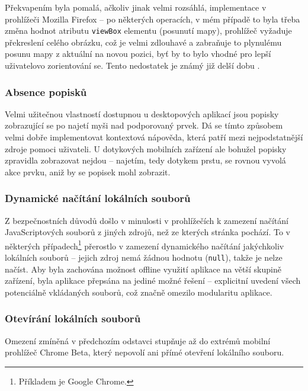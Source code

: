 Překvapením byla pomalá, ačkoliv jinak velmi rozsáhlá, implementace  v prohlížeči Mozilla Firefox -- po některých operacích, v mém případě to byla třeba změna hodnot atributu \texttt{viewBox}  elementu (posunutí mapy), prohlížeč vyžaduje překreslení celého obrázku, což je velmi zdlouhavé a zabraňuje to plynulému posunu mapy z aktuální na novou pozici, byť by to bylo vhodné pro lepší uživatelovo zorientování se. Tento nedostatek je známý již delší dobu \cite{Bugzilla}.

\subsubsection{Absence popisků}
Velmi užitečnou vlastností dostupnou u desktopových aplikací jsou popisky zobrazující se po najetí myši nad podporovaný prvek. Dá se tímto způsobem velmi dobře implementovat kontextová nápověda, která patří mezi nejpodstatnější zdroje pomoci uživateli. U dotykových mobilních zařízení ale bohužel popisky zpravidla zobrazovat nejdou -- najetím, tedy dotykem prstu, se rovnou vyvolá akce prvku, aniž by se popisek mohl zobrazit.

\subsubsection{Dynamické načítání lokálních souborů}
Z bezpečnostních důvodů došlo v minulosti v prohlížečích k zamezení načítání JavaScriptových souborů z jiných zdrojů, než ze kterých stránka pochází. To v některých případech\footnote{Příkladem je Google Chrome.} přerostlo v zamezení dynamického načítání jakýchkoliv lokálních souborů -- jejich zdroj nemá žádnou hodnotu (\texttt{null}), takže je nelze načíst. Aby byla zachována možnost offline využití aplikace na větší skupině zařízení, byla aplikace přepsána na jediné možné řešení -- explicitní uvedení všech potenciálně vkládaných souborů, což značně omezilo modularitu aplikace.

\subsubsection{Otevírání lokálních souborů}
Omezení zmíněná v předchozím odstavci stupňuje až do extrémů mobilní prohlížeč Chrome Beta, který nepovolí ani přímé otevření lokálního souboru. 

